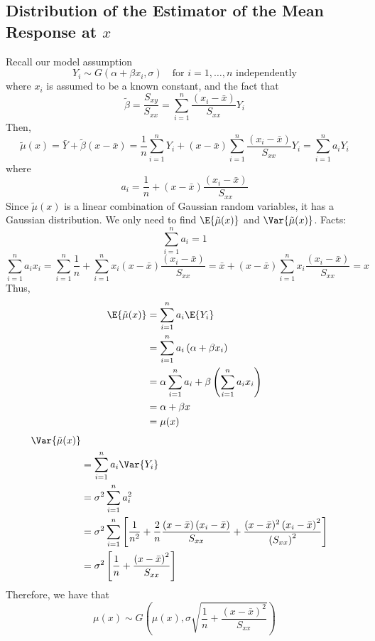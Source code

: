 \subsection{Distribution of the Estimator of the Mean Response at $ x $}
Recall our model assumption
\[Y_{i} \sim G\left(\alpha+\beta x_{i}, \sigma\right)
    \quad \text{for } i=1, \ldots, n \text{ independently}\]
where $ x_i $ is assumed to be a known constant, and the fact that
\[\tilde{\beta}=\frac{S_{x y}}{S_{x x}}=\sum_{i=1}^{n} \frac{\left(x_{i}-\bar{x}\right)}{S_{x x}} Y_{i}\]
Then,
\[\tilde{\mu}(x)=\bar{Y}+\tilde{\beta}(x-\bar{x})=\frac{1}{n} \sum_{i=1}^{n} Y_{i}+(x-\bar{x})
    \sum_{i=1}^{n} \frac{\left(x_{i}-\bar{x}\right)}{S_{x x}} Y_{i}=\sum_{i=1}^{n} a_{i} Y_{i}\]
where
\[a_{i}=\frac{1}{n}+(x-\bar{x}) \frac{\left(x_{i}-\bar{x}\right)}{S_{x x}}\]
Since $ \tilde{\mu}(x) $ is a linear combination of Gaussian random variables, it has a Gaussian
distribution. We only need to find $ \E{\tilde{\mu}(x)} $ and $ \Var{\tilde{\mu}(x)} $.
Facts:
\[ \sum\limits_{i=1}^{n} a_i=1 \]
\[ \sum\limits_{i=1}^{n} a_i x_i=\sum\limits_{i=1}^{n} \frac{1}{n} +
    \sum\limits_{i=1}^{n} x_i\left( x-\bar{x} \right)\frac{(x_i-\bar{x})}{S_{xx}}
    =\bar{x}+\left( x-\bar{x} \right)\sum\limits_{i=1}^{n} x_i \frac{\left( x_i-\bar{x} \right)}{S_{xx}}=x  \]
Thus,
\[
    \begin{aligned}
        \E{\tilde{\mu}(x)}
         & =\sum\limits_{i=1}^{n} a_i\E{Y_i}                                                   \\
         & =\sum\limits_{i=1}^{n} a_i\left( \alpha+\beta x_i \right)                           \\
         & =\alpha \sum\limits_{i=1}^{n} a_i+\beta\left( \sum\limits_{i=1}^{n} a_i x_i \right) \\
         & =\alpha+\beta x                                                                     \\
         & =\mu(x)
    \end{aligned}
\]
\[
    \begin{aligned}
        \Var{\tilde{\mu}(x)}                                                                                                  \\
         & =\sum\limits_{i=1}^{n} a_i\Var{Y_i}                                                                                \\
         & =\sigma^2 \sum\limits_{i=1}^{n} a_i^2                                                                              \\
         & =\sigma^{2} \sum_{i=1}^{n}\left[\frac{1}{n^{2}}+\frac{2}{n} \frac{(x-\bar{x})\left(x_{i}-\bar{x}\right)}{S_{x x}}+
        \frac{(x-\bar{x})^{2}\left(x_{i}-\bar{x}\right)^{2}}{\left(S_{x x}\right)^{2}}\right]                                 \\
         & =\sigma^2\left[ \frac{1}{n} +\frac{\left( x-\bar{x} \right)^2}{S_{xx}}  \right]
    \end{aligned}
\]
Therefore, we have that
\[\mu(x) \sim G\left(\mu(x), \sigma \sqrt{\frac{1}{n}+\frac{(x-\bar{x})^{2}}{S_{x x}}}\right)\]
